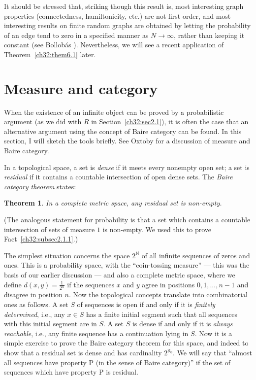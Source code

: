\documentclass{book}
\newtheorem{theorem}{Theorem}
\begin{document}
It should be stressed that, striking though this result is, most
interesting graph properties (connectedness, hamiltonicity, etc.)
are not first-order, and most interesting results on finite random
graphs are obtained by letting the probability of an edge tend to
zero in a specified manner as $N \rightarrow \infty$, rather than
keeping it constant (see Bollob\'{a}s \cite{ch32:bib3}).
Nevertheless, we will see a recent application of
Theorem~\ref{ch32:them6.1} later.

\section{Measure and category}%
\label{ch32:sec2.7}

When the existence of an infinite object can be proved by a
probabilistic argument (as we did with $R$ in
Section~\ref{ch32:sec2.1}), it is often the case that an
alternative argument using the concept of Baire category can be
found. In this section, I will sketch the tools briefly. See Oxtoby
\cite{ch32:bib39} for a discussion of measure and Baire category.

In a topological space, a set is \emph{dense} if it meets every nonempty
open set; a set is \emph{residual} if it contains a countable
intersection of open dense sets. The \emph{Baire category theorem}
states:

\begin{theorem}\label{ch32:them7.1} 
In a complete metric space, any residual set is non-empty.
\end{theorem}

(The analogous statement for probability is that a set which
contains a countable intersection of sets of measure $1$ is non-empty.
We used this to prove Fact~\ref{ch32:subsec2.1.1}.)

The simplest situation concerns the space $2^{\mathbb{N}}$ of all
infinite sequences of zeros and ones. This is a probability space,
with the ``coin-tossing measure'' --- this was the basis of our
earlier discussion --- and also a complete metric space, where we
define $d(x, y) = \frac{1}{2^n}$ if the sequences $x$ and $y$ agree
in positions $0, 1, \ldots, n - 1$ and disagree in position $n$.
Now the topological concepts translate into combinatorial ones as
follows. A set $S$ of sequences is open if and only if it is
\emph{finitely determined}, i.e., any $x \in S$ has a finite
initial segment such that all sequences with this initial segment
are in $S$. A set $S$ is dense if and only if it is \emph{always
reachable}, i.e., any finite sequence has a continuation lying in
$S$. Now it is a simple exercise to prove the Baire category theorem
for this space, and indeed to show that a residual set is dense and
has cardinality $2^{\aleph_0}$. We will say that ``almost all
sequences have property P (in the sense of Baire category)'' if the
set of sequences which have property P is residual.
\end{document}
